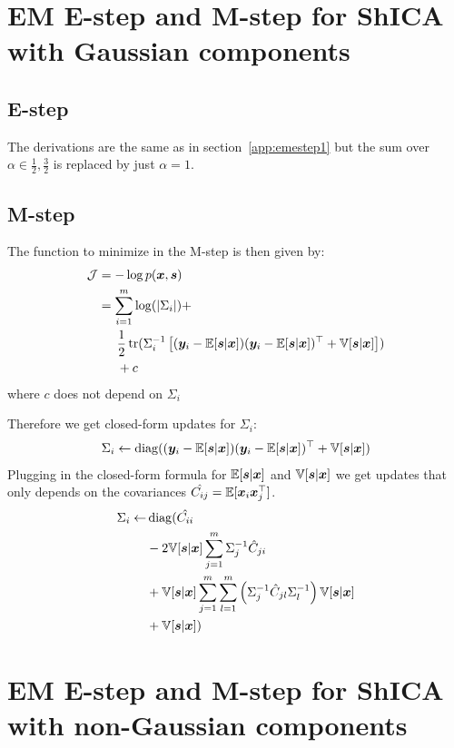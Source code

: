 \section{EM E-step and M-step for ShICA with Gaussian components}
  \subsection{E-step}
  \label{conditional_density}
  The derivations are the same as in section~\ref{app:emestep1} but the sum over
  $\alpha \in {\frac12, \frac32}$ is replaced by just $\alpha=1$.


\subsection{M-step}
The function to minimize in the M-step is then given by:
\begin{align}
  \mathcal{J} &= -\log p(\boldsymbol{x}, \boldsymbol{s}) \\
        &= \sum_{i=1}^m \log(|\Sigma_i|) + \\ &\enspace \enspace \enspace \frac12 \mathop{\mathrm{tr}}(\Sigma_i^{-1} \left[(\boldsymbol{y}_i - \mathbb{E}[\boldsymbol{s} | \boldsymbol{x}]) (\boldsymbol{y}_i - \mathbb{E}[\boldsymbol{s} | \boldsymbol{x}])^{\top}+ \mathbb{V}[\boldsymbol{s} | \boldsymbol{x}]\right]) \\ &\enspace \enspace \enspace + c
\end{align}
where $c$ does not depend on $\Sigma_i$

Therefore we get closed-form updates for $\Sigma_i$: 
\begin{align}
\Sigma_i \leftarrow  \operatorname*{diag}((\boldsymbol{y}_i - \mathbb{E}[\boldsymbol{s} | \boldsymbol{x}]) (\boldsymbol{y}_i - \mathbb{E}[\boldsymbol{s} | \boldsymbol{x}])^{\top}+ \mathbb{V}[\boldsymbol{s} | \boldsymbol{x}])
\end{align}
Plugging in the closed-form formula for $\mathbb{E}[\boldsymbol{s}|\boldsymbol{x}]$ and $\mathbb{V}[\boldsymbol{s}|\boldsymbol{x}]$ we get updates that only depends on the covariances $\hat{C_{ij}} = \mathbb{E}[\boldsymbol{x}_i \boldsymbol{x}_j^{\top}]$.
\begin{align*}
\Sigma_i \leftarrow &\operatorname*{diag}(\hat{C_{ii}} \\&- 2 \mathbb{V}[\boldsymbol{s} | \boldsymbol{x}]  \sum_{j=1}^m \Sigma_j^{-1} \hat{C}_{ji}  \\&+ \mathbb{V}[\boldsymbol{s} | \boldsymbol{x}]  \sum_{j = 1}^m \sum_{l = 1}^m \left(\Sigma_j^{-1} \hat{C}_{jl} \Sigma_l^{-1} \right) \mathbb{V}[\boldsymbol{s} | \boldsymbol{x}] \\&+ \mathbb{V}[\boldsymbol{s} | \boldsymbol{x}])
\end{align*}


\section{EM E-step and M-step for ShICA with non-Gaussian components}
\label{app:emestep}

